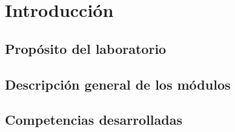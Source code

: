 \section{Introducción}


\subsection{Propósito del laboratorio}


\subsection{Descripción general de los módulos}






\subsection{Competencias desarrolladas}

